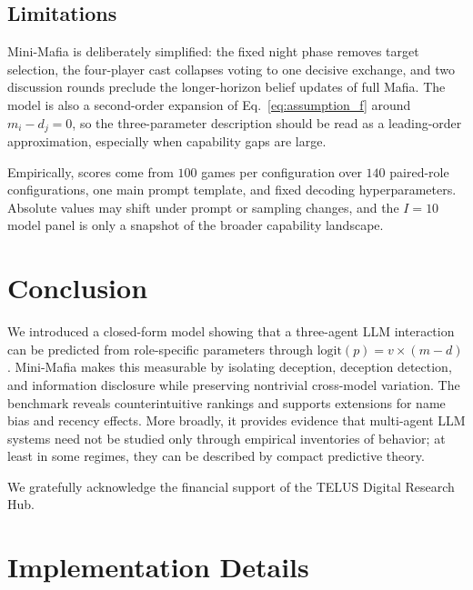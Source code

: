 \documentclass{article}
\begin{document}
\subsection{Limitations}
\label{sec:limitations}

Mini-Mafia is deliberately simplified: the fixed night phase removes target selection, the four-player cast collapses voting to one decisive exchange, and two discussion rounds preclude the longer-horizon belief updates of full Mafia. The model is also a second-order expansion of Eq.~\eqref{eq:assumption_f} around $m_i-d_j=0$, so the three-parameter description should be read as a leading-order approximation, especially when capability gaps are large.

Empirically, scores come from $100$ games per configuration over $140$ paired-role configurations, one main prompt template, and fixed decoding hyperparameters. Absolute values may shift under prompt or sampling changes, and the $I=10$ model panel is only a snapshot of the broader capability landscape.

\section{Conclusion}

We introduced a closed-form model showing that a three-agent LLM interaction can be predicted from role-specific parameters through $\text{logit}(p)=v\times(m-d)$. Mini-Mafia makes this measurable by isolating deception, deception detection, and information disclosure while preserving nontrivial cross-model variation. The benchmark reveals counterintuitive rankings and supports extensions for name bias and recency effects. More broadly, it provides evidence that multi-agent LLM systems need not be studied only through empirical inventories of behavior; at least in some regimes, they can be described by compact predictive theory.


\begin{ack}
    We gratefully acknowledge the financial support of the TELUS Digital Research Hub.
\end{ack}







\appendix

\section{Implementation Details}
\label{appendix:experimental_details}
\end{document}
